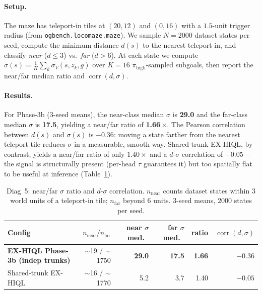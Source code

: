 \documentclass[11pt]{article}
\begin{document}
\paragraph{Setup.}
The maze has teleport-in tiles at $(20,12)$ and $(0,16)$ with a
$1.5$-unit trigger radius (from \texttt{ogbench.locomaze.maze}).
We sample $N = 2000$ dataset states per seed, compute the minimum
distance $d(s)$ to the nearest teleport-in, and classify \emph{near}
($d\!\le\!3$) vs.\ \emph{far} ($d\!>\!6$).
At each state we compute
$\sigma(s) = \tfrac{1}{K}\sum_{k} \sigma_V(s, z_k, g)$ over $K=16$
$\pi_\text{high}$-sampled subgoals, then report the near/far median
ratio and $\operatorname{corr}(d, \sigma)$.

\paragraph{Results.}
For Phase-3b (3-seed means), the near-class median $\sigma$ is
\textbf{29.0} and the far-class median $\sigma$ is \textbf{17.5},
yielding a near/far ratio of \textbf{1.66}\,$\times$.
The Pearson correlation between $d(s)$ and $\sigma(s)$ is
$\mathbf{-0.36}$: moving a state farther from the nearest teleport tile
reduces $\sigma$ in a measurable, smooth way.
Shared-trunk EX-HIQL, by contrast, yields a near/far ratio of only
$1.40\times$ and a $d$-$\sigma$ correlation of $-0.05$---the signal is
structurally present (per-head $\tau$ guarantees it) but too spatially
flat to be useful at inference
(Table~\ref{tab:teleport_overlay}).

\begin{table}[h]
  \centering
  \caption{Diag~5: near/far $\sigma$ ratio and $d$-$\sigma$ correlation.
           $n_\text{near}$ counts dataset states within 3 world units of a
           teleport-in tile; $n_\text{far}$ beyond 6 units.
           3-seed means, 2000 states per seed.}
  \label{tab:teleport_overlay}
  \small
  \begin{tabular}{lrrrrr}
    \toprule
    Config & $n_\text{near}/n_\text{far}$ &
           near $\sigma$ med.\ & far $\sigma$ med.\ &
           ratio & $\operatorname{corr}(d, \sigma)$ \\
    \midrule
    \textbf{EX-HIQL Phase-3b (indep trunks)} & $\sim$19 / $\sim$1750 &
           \textbf{29.0} & \textbf{17.5} &
           \textbf{1.66} & \textbf{$-0.36$} \\
    Shared-trunk EX-HIQL                      & $\sim$16 / $\sim$1770 &
           5.2  & 3.7  &
           1.40 & $-0.05$ \\
    \bottomrule
  \end{tabular}
\end{table}
\end{document}
